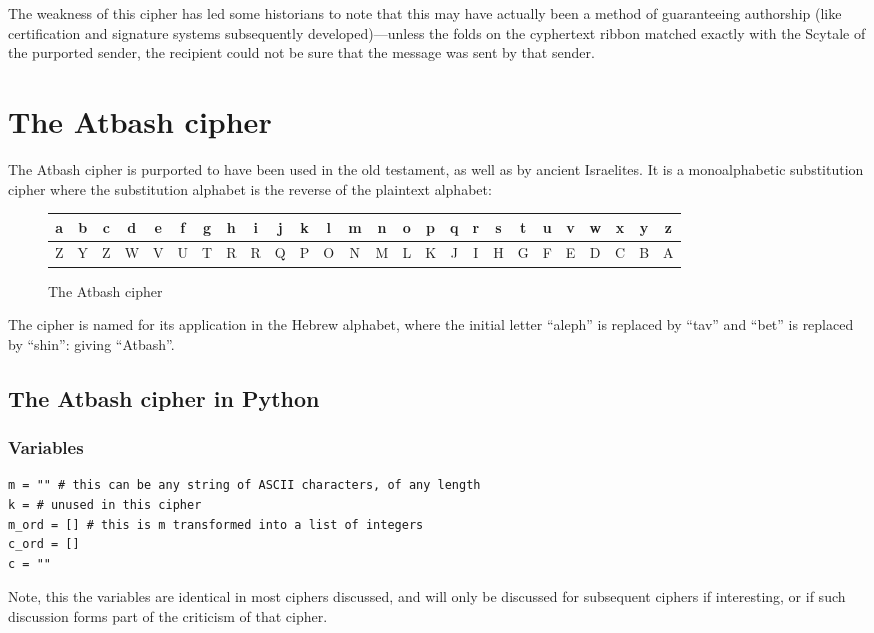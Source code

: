 \documentclass{AIAA}
\begin{document}
The weakness of this cipher has led some historians to note that this may have actually been a method of guaranteeing authorship (like certification and signature systems subsequently developed)---unless the folds on the cyphertext ribbon matched exactly with the Scytale of the purported sender, the recipient could not be sure that the message was sent by that sender.

\section{The Atbash cipher}
The Atbash cipher is purported to have been used in the old testament, as well as by ancient Israelites. It is a monoalphabetic substitution cipher where the substitution alphabet is the reverse of the plaintext alphabet:

\begin{figure}[h!]
\begin{tabular}{|c|c|c|c|c|c|c|c|c|c|c|c|c|c|c|c|c|c|c|c|c|c|c|c|c|c|}
\hline
a & b & c & d & e & f & g & h & i & j & k & l & m & n & o & p & q & r & s & t & u & v & w & x & y & z \\ \hline
Z & Y & Z & W & V & U & T & R & R & Q & P & O & N & M & L & K & J & I & H & G & F & E & D & C & B & A \\
\hline
\end{tabular}
\caption{The Atbash cipher}
\end{figure}

The cipher is named for its application in the Hebrew alphabet, where the initial letter ``aleph'' is replaced by ``tav'' and ``bet'' is replaced by ``shin'': giving ``Atbash''. 

\subsection{The Atbash cipher in Python}

\subsubsection{Variables}
\begin{verbatim}
m = "" # this can be any string of ASCII characters, of any length
k = # unused in this cipher
m_ord = [] # this is m transformed into a list of integers
c_ord = []
c = ""
\end{verbatim}
Note, this the variables are identical in most ciphers discussed, and will only be discussed for subsequent ciphers if interesting, or if such discussion forms part of the criticism of that cipher.
\end{document}

